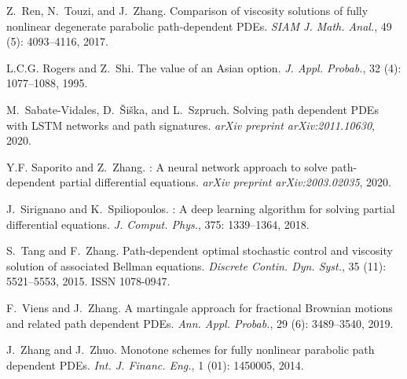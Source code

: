 \documentclass[12pt]{article}
\numberwithin{equation}{section}
\begin{document}
\begin{thebibliography}{26}
Z.~Ren, N.~Touzi, and J.~Zhang.
\newblock Comparison of viscosity solutions of fully nonlinear degenerate
  parabolic path-dependent {PDE}s.
\newblock \emph{SIAM J. Math. Anal.}, 49 (5): 4093--4116,
  2017.

L.C.G. Rogers and Z.~Shi.
\newblock The value of an {A}sian option.
\newblock \emph{J. Appl. Probab.}, 32 (4): 1077--1088, 1995.

M.~Sabate-Vidales, D.~{\v{S}}i{\v{s}}ka, and L.~Szpruch.
\newblock Solving path dependent {PDE}s with {LSTM} networks and path
  signatures.
\newblock \emph{arXiv preprint arXiv:2011.10630}, 2020.

Y.F. Saporito and Z.~Zhang.
: {A} neural network approach to solve path-dependent partial
  differential equations.
\newblock \emph{arXiv preprint arXiv:2003.02035}, 2020.

J.~Sirignano and K.~Spiliopoulos.
: A deep learning algorithm for solving partial differential
  equations.
\newblock \emph{J. Comput. Phys.}, 375: 1339--1364, 2018.

S.~Tang and F.~Zhang.
\newblock Path-dependent optimal stochastic control and viscosity solution of
  associated {B}ellman equations.
\newblock \emph{Discrete Contin. Dyn. Syst.}, 35 (11):
  5521--5553, 2015.
\newblock ISSN 1078-0947.

F.~Viens and J.~Zhang.
\newblock A martingale approach for fractional {Brownian} motions and related
  path dependent {PDEs}.
\newblock \emph{Ann. Appl. Probab.}, 29 (6): 3489--3540,
  2019.

J.~Zhang and J.~Zhuo.
\newblock Monotone schemes for fully nonlinear parabolic path dependent {PDEs}.
\newblock \emph{Int. J. Financ. Eng.}, 1 (01): 1450005, 2014.

\end{thebibliography}

% 
% 
% 
\end{document}
